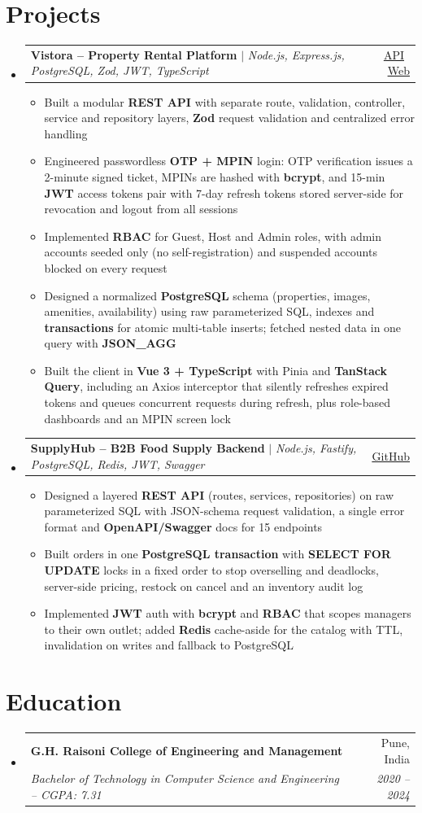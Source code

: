 \documentclass[a4paper,11pt]{article}
\makeatletter
\newcommand{\bulletgap}{1.5pt}     %
\newcommand{\entrygap}{4pt}        %
\newcommand{\resumeItem}[1]{\item\small{#1}}
\newcommand{\resumeSubheading}[4]{
  \vspace{\entrygap}\item
  \begin{tabular*}{\textwidth}[t]{l@{\extracolsep{\fill}}r}
    \textbf{#1} & \small #2 \\
    \textit{\small #3} & \textit{\small #4} \\
  \end{tabular*}\vspace{-3pt}}
\newcommand{\resumeProjectHeading}[2]{
  \vspace{\entrygap}\item
  \begin{tabular*}{\textwidth}{l@{\extracolsep{\fill}}r}
    \small #1 & \small #2 \\
  \end{tabular*}\vspace{-3pt}}
\newcommand{\resumeSubHeadingListStart}{\begin{itemize}[leftmargin=0in, label={}, topsep=0pt]}
\newcommand{\resumeSubHeadingListEnd}{\end{itemize}}
\newcommand{\resumeItemListStart}{\begin{itemize}[leftmargin=0.15in, itemsep=\bulletgap, parsep=0pt, topsep=2pt]}
\newcommand{\resumeItemListEnd}{\end{itemize}\vspace{-4pt}}
\makeatother
\begin{document}
\section{Projects}
\resumeSubHeadingListStart
  \resumeProjectHeading
    {\textbf{Vistora -- Property Rental Platform} $|$ \emph{Node.js, Express.js, PostgreSQL, Zod, JWT, TypeScript}}
    {\href{https://github.com/omkarswami20/VistoraServer}{\underline{API}} \, \href{https://github.com/omkarswami20/vistora-web}{\underline{Web}}}
    \resumeItemListStart
      \resumeItem{Built a modular \textbf{REST API} with separate route, validation, controller, service and repository layers, \textbf{Zod} request validation and centralized error handling}
      \resumeItem{Engineered passwordless \textbf{OTP + MPIN} login: OTP verification issues a 2-minute signed ticket, MPINs are hashed with \textbf{bcrypt}, and 15-min \textbf{JWT} access tokens pair with 7-day refresh tokens stored server-side for revocation and logout from all sessions}
      \resumeItem{Implemented \textbf{RBAC} for Guest, Host and Admin roles, with admin accounts seeded only (no self-registration) and suspended accounts blocked on every request}
      \resumeItem{Designed a normalized \textbf{PostgreSQL} schema (properties, images, amenities, availability) using raw parameterized SQL, indexes and \textbf{transactions} for atomic multi-table inserts; fetched nested data in one query with \textbf{JSON\_AGG}}
      \resumeItem{Built the client in \textbf{Vue 3 + TypeScript} with Pinia and \textbf{TanStack Query}, including an Axios interceptor that silently refreshes expired tokens and queues concurrent requests during refresh, plus role-based dashboards and an MPIN screen lock}
    \resumeItemListEnd

  \resumeProjectHeading
    {\textbf{SupplyHub -- B2B Food Supply Backend} $|$ \emph{Node.js, Fastify, PostgreSQL, Redis, JWT, Swagger}}
    {\href{https://github.com/omkardev20/scfsproducts}{\underline{GitHub}}}
    \resumeItemListStart
      \resumeItem{Designed a layered \textbf{REST API} (routes, services, repositories) on raw parameterized SQL with JSON-schema request validation, a single error format and \textbf{OpenAPI/Swagger} docs for 15 endpoints}
      \resumeItem{Built orders in one \textbf{PostgreSQL transaction} with \textbf{SELECT FOR UPDATE} locks in a fixed order to stop overselling and deadlocks, server-side pricing, restock on cancel and an inventory audit log}
      \resumeItem{Implemented \textbf{JWT} auth with \textbf{bcrypt} and \textbf{RBAC} that scopes managers to their own outlet; added \textbf{Redis} cache-aside for the catalog with TTL, invalidation on writes and fallback to PostgreSQL}
    \resumeItemListEnd
\resumeSubHeadingListEnd
\vspace{-6pt}

\section{Education}
\resumeSubHeadingListStart
  \resumeSubheading
    {G.H. Raisoni College of Engineering and Management}{Pune, India}
    {Bachelor of Technology in Computer Science and Engineering -- CGPA: 7.31}{2020 -- 2024}
\resumeSubHeadingListEnd
\end{document}
